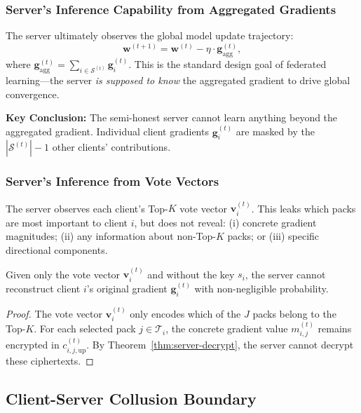 \subsubsection{Server's Inference Capability from Aggregated Gradients}

The server ultimately observes the global model update trajectory:
\begin{equation}
    \mathbf{w}^{(t+1)} = \mathbf{w}^{(t)} - \eta \cdot \mathbf{g}_{\mathrm{agg}}^{(t)},
\end{equation}
where $\mathbf{g}_{\mathrm{agg}}^{(t)} = \sum_{i \in \mathcal{S}^{(t)}} \mathbf{g}_i^{(t)}$. This is the standard design goal of federated learning---the server \emph{is supposed to know} the aggregated gradient to drive global convergence.

\textbf{Key Conclusion:} The semi-honest server cannot learn anything beyond the aggregated gradient. Individual client gradients $\mathbf{g}_i^{(t)}$ are masked by the $|\mathcal{S}^{(t)}|-1$ other clients' contributions.

\subsubsection{Server's Inference from Vote Vectors}

The server observes each client's Top-$K$ vote vector $\mathbf{v}_i^{(t)}$. This leaks which packs are most important to client $i$, but does not reveal: (i) concrete gradient magnitudes; (ii) any information about non-Top-$K$ packs; or (iii) specific directional components.

\begin{theorem}
\label{thm:vote-privacy}
Given only the vote vector $\mathbf{v}_i^{(t)}$ and without the key $s_i$, the server cannot reconstruct client $i$'s original gradient $\mathbf{g}_i^{(t)}$ with non-negligible probability.
\end{theorem}

\begin{proof}
The vote vector $\mathbf{v}_i^{(t)}$ only encodes which of the $J$ packs belong to the Top-$K$. For each selected pack $j \in \mathcal{T}_i$, the concrete gradient value $m_{i,j}^{(t)}$ remains encrypted in $c_{i,j,\mathrm{up}}^{(t)}$. By Theorem~\ref{thm:server-decrypt}, the server cannot decrypt these ciphertexts.
\end{proof}

\subsection{Client-Server Collusion Boundary}
\label{ssec:collusion}

